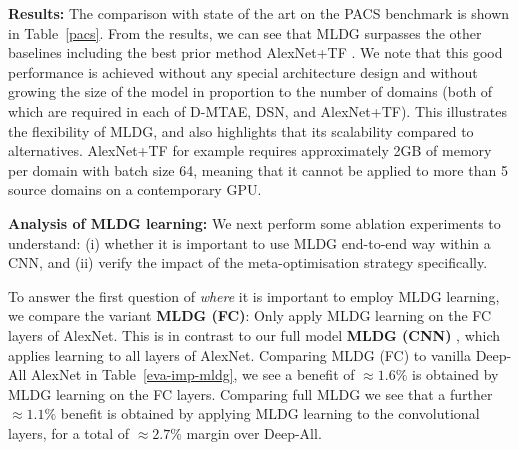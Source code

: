 \documentclass[letterpaper]{article} \usepackage{aaai18}  \usepackage{times}  \usepackage{helvet}  \usepackage{courier}  \usepackage{url}  \usepackage{graphicx}  \usepackage{amsmath}
\newcommand{\keypoint}[1]{\vspace{0.1cm}\noindent\textbf{#1}\quad}
\begin{document}
{\begin{table}[t]
\centering
\caption{PACS benchmark: Evaluation of MLDG variants.}
\label{eva-variants-mldg}
\end{table}

\keypoint{Results:}  The comparison with state of the art on the PACS benchmark is shown in Table~\ref{pacs}. From the results, we can see that  MLDG surpasses the other baselines including the best prior method AlexNet+TF \cite{da2017dg}. We note that this good performance is achieved without any special architecture design  and without growing the size of the model in proportion to the number of domains (both of which are required in each of D-MTAE, DSN, and AlexNet+TF). This illustrates the flexibility of MLDG, and also highlights that its scalability compared to alternatives. AlexNet+TF for example requires approximately 2GB of memory per domain with batch size 64, meaning that it cannot be applied to more than 5 source domains on a contemporary GPU.

\keypoint{Analysis of MLDG learning:}  We next perform some ablation experiments to understand: (i) whether it is important to use MLDG end-to-end way within a CNN, and (ii) verify the impact of the meta-optimisation strategy specifically. 

To answer the first question of \emph{where} it is important to employ MLDG learning, we compare the variant \textbf{MLDG (FC)}: Only apply MLDG learning on the {FC} layers of AlexNet. This is in contrast to our full model \textbf{MLDG (CNN) }, which applies learning to all layers of AlexNet. Comparing MLDG (FC) to vanilla Deep-All AlexNet in Table~\ref{eva-imp-mldg}, we see a benefit of $\approx 1.6\%$ is obtained by  MLDG learning on the FC layers. Comparing full MLDG we see that a further $\approx 1.1\%$ benefit is obtained by applying MLDG learning to the convolutional layers, for a total of $\approx 2.7\%$ margin over Deep-All.

}
\end{document}
